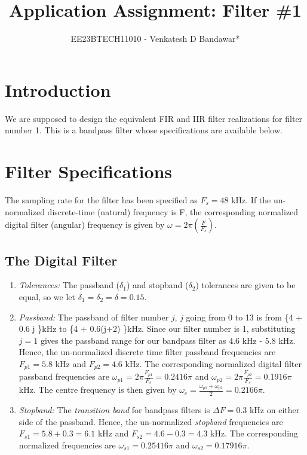 \documentclass{article}
\begin{document}
\title{ Application Assignment: Filter \#1}

\author{EE23BTECH11010 - Venkatesh D Bandawar*}

\maketitle
\section{Introduction}
We are supposed to design the equivalent FIR and IIR filter realizations for filter number 1.  
This is a bandpass filter whose specifications are available below.

\section{Filter Specifications}
The sampling rate for the filter has been specified as $F_s =  48$ kHz.	If the un-normalized  discrete-time (natural) frequency is F, the corresponding normalized digital filter (angular) frequency is given by $\omega = 2\pi
\left(\frac{F}{F_s}\right)$.

\subsection{The Digital Filter}

\begin{enumerate}
\item {\em Tolerances:}  The passband ($\delta_1$) and stopband ($\delta_2$) tolerances are given to
be equal, so we let $\delta_1 = \delta_2 = \delta = 0.15$.

\item {\em Passband:}  The passband of filter number $j$, $j$ going from 0 to 13 is from \{4 + 0.6 j \}kHz
to \{4 + 0.6(j+2) \}kHz.  Since our filter number is 1, substituting $j = 1$ gives the passband
range for our bandpass filter as $4.6$ kHz - $5.8$ kHz.  Hence, the un-normalized discrete time filter
passband frequencies are $F_{p1} = 5.8$ kHz
and $F_{p2} = 4.6$ kHz.  The corresponding normalized digital filter passband frequencies are
$\omega_{p1} = 2\pi\frac{F_{p1}}{F_s}  = 0.2416\pi$  and $\omega_{p2} = 2\pi\frac{F_{p2}}{F_s}  = 0.1916 \pi$ kHz.  The centre frequency is then given by  $\omega_c = \frac{\omega_{p1} + \omega_{p2}}{2} = 0.2166\pi$.  

\item {\em Stopband:}  The {\em transition band} for bandpass filters is $\Delta F = 0.3$ kHz on either side of the passband.
Hence, the un-normalized {\em stopband} frequencies are $F_{s1} = 5.8 + 0.3 = 6.1$ kHz and $F	_{s2} = 4.6 - 0.3 = 4.3$ kHz.  The corresponding normalized frequencies are $\omega_{s1} = 0.25416 \pi$  and $\omega_{s2} =  0.17916 \pi$.
\end{enumerate}
\end{document}
